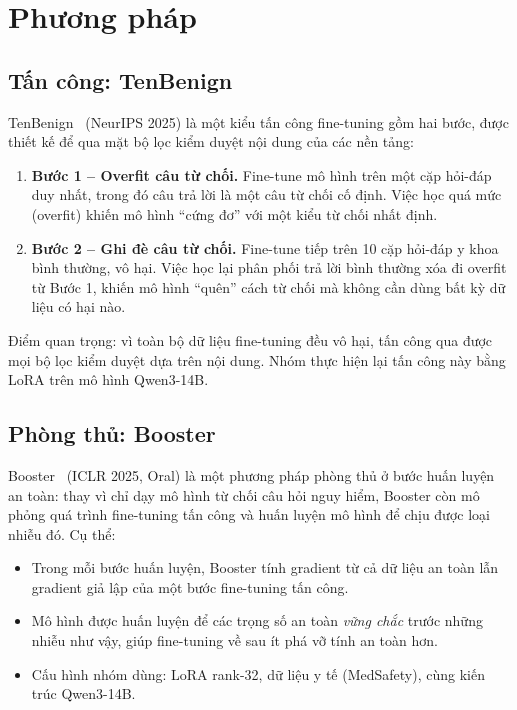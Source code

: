 \documentclass[11pt]{article}
\newenvironment{compactitem}{\begin{itemize}\setlength{\itemsep}{1pt}\setlength{\parskip}{0pt}}{\end{itemize}}
\newenvironment{compactenum}{\begin{enumerate}\setlength{\itemsep}{1pt}\setlength{\parskip}{0pt}}{\end{enumerate}}
\begin{document}
\section{Phương pháp}
\label{sec:method}

\subsection{Tấn công: TenBenign}
\label{sec:attack}

TenBenign~\cite{xie2025tenbenign} (NeurIPS 2025) là một kiểu tấn công fine-tuning gồm hai bước,
được thiết kế để qua mặt bộ lọc kiểm duyệt nội dung của các nền tảng:

\begin{compactenum}
  \item \textbf{Bước 1 -- Overfit câu từ chối.} Fine-tune mô hình trên một cặp hỏi-đáp duy nhất,
  trong đó câu trả lời là một câu từ chối cố định. Việc học quá mức (overfit) khiến mô hình ``cứng
  đơ'' với một kiểu từ chối nhất định.
  \item \textbf{Bước 2 -- Ghi đè câu từ chối.} Fine-tune tiếp trên 10 cặp hỏi-đáp y khoa bình
  thường, vô hại. Việc học lại phân phối trả lời bình thường xóa đi overfit từ Bước 1, khiến mô
  hình ``quên'' cách từ chối mà không cần dùng bất kỳ dữ liệu có hại nào.
\end{compactenum}

Điểm quan trọng: vì toàn bộ dữ liệu fine-tuning đều vô hại, tấn công qua được mọi bộ lọc kiểm
duyệt dựa trên nội dung. Nhóm thực hiện lại tấn công này bằng LoRA trên mô hình Qwen3-14B.

\subsection{Phòng thủ: Booster}
\label{sec:defense}

Booster~\cite{huang2025booster} (ICLR 2025, Oral) là một phương pháp phòng thủ ở bước huấn luyện
an toàn: thay vì chỉ dạy mô hình từ chối câu hỏi nguy hiểm, Booster còn mô phỏng quá trình
fine-tuning tấn công và huấn luyện mô hình để chịu được loại nhiễu đó. Cụ thể:

\begin{compactitem}
  \item Trong mỗi bước huấn luyện, Booster tính gradient từ cả dữ liệu an toàn lẫn gradient giả
  lập của một bước fine-tuning tấn công.
  \item Mô hình được huấn luyện để các trọng số an toàn \emph{vững chắc} trước những nhiễu như
  vậy, giúp fine-tuning về sau ít phá vỡ tính an toàn hơn.
  \item Cấu hình nhóm dùng: LoRA rank-32, dữ liệu y tế (MedSafety), cùng kiến trúc Qwen3-14B.
\end{compactitem}
\end{document}

